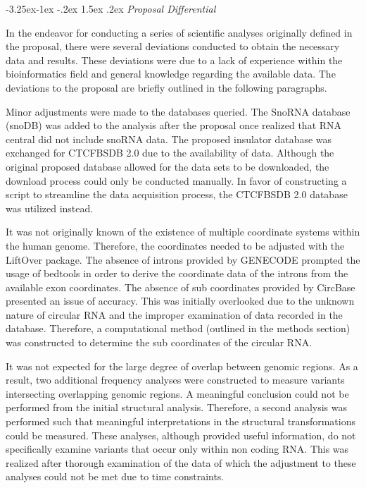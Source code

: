 \documentclass[11pt]{article}
\makeatletter
\renewcommand\subsection{\@startsection{subsection}{2}{\z@}%
                                         {-3.25ex\@plus -1ex \@minus -.2ex}%
                                         {1.5ex \@plus .2ex}%
                                         {\normalfont\fontfamily{phv}\fontsize{14}{17}\bfseries}}
\makeatother
\begin{document}
\subsection{
\emph{Proposal Differential}} \label{s:prop differential}

In the endeavor for conducting a series of scientific analyses originally defined in the proposal, there were several deviations conducted to obtain the necessary data and results. These deviations were due to a lack of experience within the bioinformatics field and general knowledge regarding the available data. The deviations to the proposal are briefly outlined in the following paragraphs. 

Minor adjustments were made to the databases queried. The SnoRNA database (snoDB) was added to the analysis after the proposal once realized that RNA central did not include snoRNA data. The proposed insulator database was exchanged for CTCFBSDB 2.0 due to the availability of data. Although the original proposed database allowed for the data sets to be downloaded, the download process could only be conducted manually. In favor of constructing a script to streamline the data acquisition process, the CTCFBSDB 2.0 database was utilized instead. 

It was not originally known of the existence of multiple coordinate systems within the human genome. Therefore, the coordinates needed to be adjusted with the LiftOver package. The absence of introns provided by GENECODE prompted the usage of bedtools in order to derive the coordinate data of the introns from the available exon coordinates. The absence of sub coordinates provided by CircBase presented an issue of accuracy. This was initially overlooked due to the unknown nature of circular RNA and the improper examination of data recorded in the database. Therefore, a computational method (outlined in the methods section) was constructed to determine the sub coordinates of the circular RNA. 

It was not expected for the large degree of overlap between genomic regions. As a result, two additional frequency analyses were constructed to measure variants intersecting overlapping genomic regions. A meaningful conclusion could not be performed from the initial structural analysis. Therefore, a second analysis was performed such that meaningful interpretations in the structural transformations could be measured. These analyses, although provided useful information, do not specifically examine variants that occur only within non coding RNA. This was realized after thorough examination of the data of which the adjustment to these analyses could not be met due to time constraints.  
\end{document}
